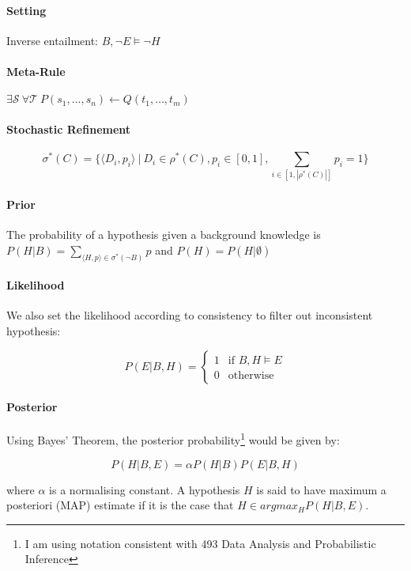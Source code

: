 \documentclass{article}
\theoremstyle{plain}
\theoremstyle{definition}
\begin{document}
\begin{multicols}{2}
\paragraph{Setting} Inverse entailment: $B, \lnot E \models \lnot H$

\paragraph{Meta-Rule} $\exists \mathcal{S}\ \forall\mathcal{T}\ P(s_1, \dots, s_n) \leftarrow Q(t_1, \dots, t_m)$

\paragraph{Stochastic Refinement} 

{\footnotesize
$$\sigma^*(C) = \{\langle D_i, p_i \rangle\ |\ D_i \in \rho^*(C), p_i \in [0, 1], \sum_{i \in [1, |\rho^*(C)|]} p_i = 1 \}$$}

\paragraph{Prior} The probability of a hypothesis given a background knowledge is $P(H|B) = \sum_{\langle H, p \rangle \in \sigma^*(\lnot B)} p$ and $P(H) = P(H|\emptyset)$

\paragraph{Likelihood} We also set the likelihood according to consistency to filter out inconsistent hypothesis:

\[
P(E|B,H) = \begin{cases}
1 & \text{if } B,H \models E\\
0 & \text{otherwise}
\end{cases}
\]

\paragraph{Posterior} Using Bayes' Theorem, the posterior probability\footnote{I am using notation consistent with 493 Data Analysis and Probabilistic Inference} would be given by:

$$P(H|B,E) = \alpha P(H|B)P(E|B,H)$$

\noindent where $\alpha$ is a normalising constant. A hypothesis $H$ is said to have maximum a posteriori (MAP) estimate if it is the case that $H \in argmax_H P(H|B,E)$.


\end{multicols}
\end{document}
